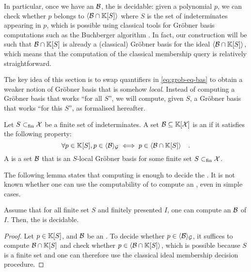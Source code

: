 In particular, once we have an  $\Basis$, the
 is decidable: given a polynomial $p$,
we can check whether $p$ belongs to $\gen{\Basis \cap \poly{\K}{S}}{}$ where
$S$ is the set of indeterminates appearing in $p$, which is possible using
classical tools for Gröbner basis computations such as the Buchberger algorithm
\cite{BUCH76}. In fact, our construction will be such that $\Basis \cap
\poly{\K}{S}$ is already a (classical) Gröbner basis for the ideal $\gen{\Basis
\cap \poly{\K}{S}}{}$, which means that the computation of the classical
membership query is relatively straightforward.

The key idea of this section is to swap quantifiers in \cref{eq:grob-eq-bas}
to obtain a weaker notion of Gröbner basis that is somehow
\emph{local}.  Instead of computing a Gröbner basis that works
``for all $S$'', we will compute, given $S$, a
Gröbner basis that works ``for this $S$'', as formalised hereafter.
\begin{definition}
    \label{def:weak-grob}
    Let $S \subset_{\text{fin}} \mathcal{X}$ be a finite set of indeterminates.
    A set $\Basis \subseteq \poly{\K}{\X}$ is an 
    if it satisfies the following property:
    \begin{equation}
        \label{eq:weak-grob}
        \forall p \in \poly{\K}{S},
        p \in \gen{\Basis}{\group}
        \iff
        p \in \gen{\Basis \cap \poly{\K}{S}}
        \quad .
    \end{equation}
    A  
    is a set $\Basis$ that is an $S$-local Gröbner basis
    for some finite set $S \subset_{\text{fin}} \mathcal{X}$.
\end{definition}

The following lemma states that computing  is enough to
decide the . It is not known whether
one can use the computability of  to compute an
, even in simple cases.

\begin{lemma}
    Assume that for all finite set $S$ and 
    finitely presented  $I$,
    one can compute an 
     $\Basis$ of $I$.
    Then, the
    is decidable.
\end{lemma}
\begin{proof}
    Let $p \in \mathbb{K}[S]$, 
    and $\Basis$ be an .
    To decide whether $p \in \gen{\Basis}{\group}$,
    it suffices to compute $\Basis \cap \poly{\K}{S}$
    and check whether 
    $p \in \gen{\Basis \cap \poly{\K}{S}}{}$, which is possible
    because $S$ is a finite set and one can therefore use 
    the classical ideal membership decision procedure.
\end{proof}

